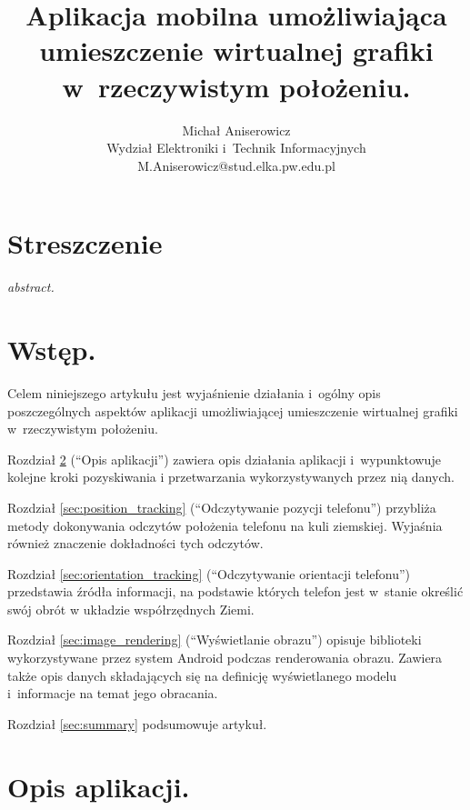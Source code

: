 \documentclass[a4paper,twocolumn,11pt]{article}
\title{{\mycfsb{14} Aplikacja mobilna umożliwiająca umieszczenie wirtualnej grafiki w~rzeczywistym położeniu.}}
\author{{\mycfs{12} Michał Aniserowicz} \\ {\mycfs{11} Wydział Elektroniki i~Technik Informacyjnych} \\ {\mycfs{11} M.Aniserowicz@stud.elka.pw.edu.pl}}
\date{}
\begin{document}
\vspace{1.5cm}

\maketitle




\section*{Streszczenie}

\emph{abstract.}




\section{Wstęp.}

Celem niniejszego artykułu jest wyjaśnienie działania i~ogólny opis poszczególnych aspektów aplikacji umożliwiającej umieszczenie wirtualnej grafiki w~rzeczywistym położeniu.

Rozdział \ref{sec:app_description} (``Opis aplikacji'') zawiera opis działania aplikacji i~wypunktowuje kolejne kroki pozyskiwania i przetwarzania wykorzystywanych przez nią danych.

Rozdział \ref{sec:position_tracking} (``Odczytywanie pozycji telefonu'') przybliża metody dokonywania odczytów położenia telefonu na kuli ziemskiej.
Wyjaśnia również znaczenie dokładności tych odczytów.

Rozdział \ref{sec:orientation_tracking} (``Odczytywanie orientacji telefonu'') przedstawia źródła informacji, na podstawie których telefon jest w~stanie określić swój obrót w układzie współrzędnych Ziemi.

Rozdział \ref{sec:image_rendering} (``Wyświetlanie obrazu'') opisuje biblioteki wykorzystywane przez system Android podczas renderowania obrazu. Zawiera także opis danych składających się na definicję wyświetlanego modelu i~informacje na temat jego obracania.

Rozdział \ref{sec:summary} podsumowuje artykuł.




\section{Opis aplikacji.} \label{sec:app_description}
\end{document}
